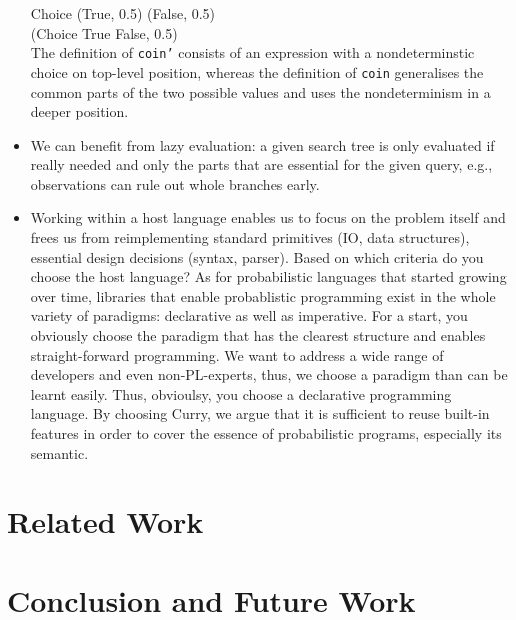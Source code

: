 \documentclass[
12pt, %
a4paper, %
oneside, %
]{llncs}
\newcommand{\code}[1]{{\texttt{#1}}}
\begin{document}
\begin{itemize}
  Choice (True, 0.5) (False, 0.5)\\%
  (Choice True False, 0.5)\\%

  The definition of \code{coin'} consists of an expression with a
  nondeterminstic choice on top-level position, whereas the definition
  of \code{coin} generalises the common parts of the two possible
  values and uses the nondeterminism in a deeper position. %


\item We can benefit from lazy evaluation: a given search tree is only
  evaluated if really needed and only the parts that are essential for
  the given query, e.g., observations can rule out whole branches
  early. %

\item Working within a host language enables us to focus on the
  problem itself and frees us from reimplementing standard primitives
  (IO, data structures), essential design decisions (syntax,
  parser). %
  Based on which criteria do you choose the host language? %
  As for probabilistic languages that started growing over time,
  libraries that enable probablistic programming exist in the whole
  variety of paradigms: declarative as well as imperative. %
  For a start, you obviously choose the paradigm that has the clearest
  structure and enables straight-forward programming. %
  We want to address a wide range of developers and even
  non-PL-experts, thus, we choose a paradigm than can be learnt
  easily. %
  Thus, obvioulsy, you choose a declarative programming language. %
  By choosing Curry, we argue that it is sufficient to reuse built-in
  features in order to cover the essence of probabilistic programs,
  especially its semantic. %
  
\end{itemize}

\section{Related Work}

\section{Conclusion and Future Work}



\end{document}
